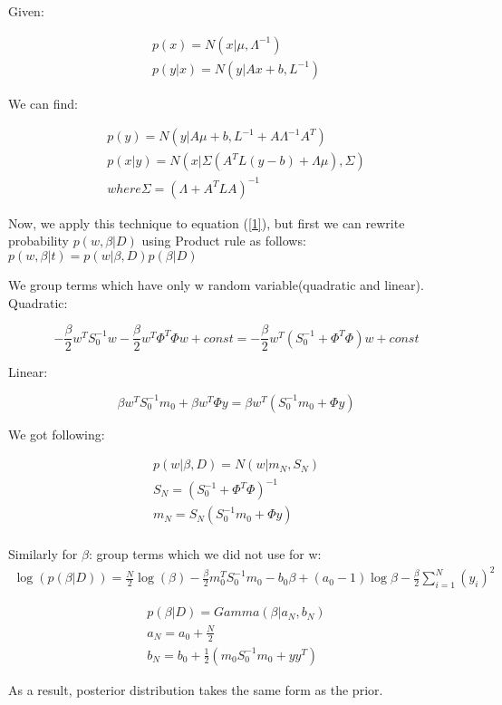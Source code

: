 \documentclass[]{report}
\begin{document}
Given:

\begin{align*}
p(x) = N(x|\mu, \Lambda^{-1}) \\
p(y|x) = N(y|Ax+b, L^{-1})
\end{align*}

We can find: 

\begin{align*}
p(y) = N(y|A\mu+b, L^{-1}+A\Lambda^{-1}A^{T}) \\
p(x|y) = N(x|\Sigma(A^TL(y-b)+\Lambda\mu), \Sigma) \\
where  \Sigma = (\Lambda + A^TLA)^{-1}
\end{align*}

Now, we apply this technique to equation (\ref{1}), but first we can rewrite probability $p(w,\beta|D)$ using Product rule as follows: $p(w, \beta|t)=p(w|\beta, D)p(\beta|D)$

We group terms which have only w random variable(quadratic and linear).
Quadratic:

\begin{equation*}
-\frac{\beta}{2}w^{T}S_0^{-1}w - \frac{\beta}{2}w^{T}\Phi^{T}\Phi w+const = -\frac{\beta}{2}w^{T}(S_0^{-1}+\Phi^{T}\Phi)w + const
\end{equation*}

Linear:

\begin{equation*}
\beta w^{T}S_0^{-1}m_0 + \beta w^{T}\Phi y = \beta w^{T}(S_0^{-1}m_0 + \Phi y)
\end{equation*}

We got following:

\begin{align*}
p(w|\beta,D) = N(w|m_N, S_N) \\
S_N = (S_0^{-1}+\Phi^{T}\Phi)^{-1} \\
m_N = S_N(S_0^{-1}m_0 + \Phi y) \\
\end{align*}

Similarly for $\beta$: group terms which we did not use for w:
\begin{align*}
\log(p(\beta|D)) = \frac{N}{2}\log(\beta) - \frac{\beta}{2}m_0^{T}S_0^{-1}m_0 - b_0\beta + (a_0 - 1)\log{\beta} - \frac{\beta}{2}\sum_{i=1}^{N}(y_i)^{2}
\end{align*}

\begin{align*}
p(\beta|D) = Gamma(\beta|a_N, b_N) \\
a_N = a_0 + \frac{N}{2} \\
b_N = b_0 + \frac{1}{2}(m_0S_0^{-1}m_0 + yy^{T})
\end{align*}

As a result, posterior distribution takes the same form as the prior.
\end{document}
